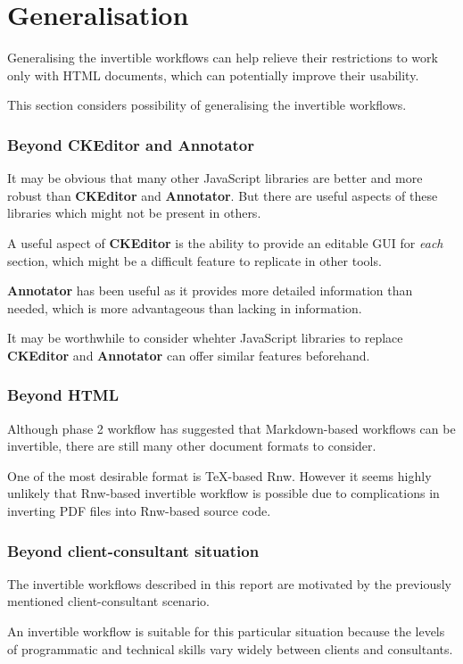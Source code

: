 \documentclass[a4paper, 12pt]{report}
\begin{document}
\section*{Generalisation}
Generalising the invertible workflows can help relieve their restrictions to work only with HTML documents, which can potentially improve their usability.

This section considers possibility of generalising the invertible workflows.


\subsubsection*{Beyond CKEditor and Annotator}
It may be obvious that many other JavaScript libraries are better and more robust than \textbf{CKEditor} and \textbf{Annotator}. But there are useful aspects of these libraries which might not be present in others.

A useful aspect of \textbf{CKEditor} is the ability to provide an editable GUI for \emph{each} section, which might be a difficult feature to replicate in other tools.

\textbf{Annotator} has been useful as it provides more detailed information than needed, which is more advantageous than lacking in information.

It may be worthwhile to consider whehter JavaScript libraries to replace \textbf{CKEditor} and \textbf{Annotator} can offer similar features beforehand.


\subsubsection*{Beyond HTML}
Although phase 2 workflow has suggested that Markdown-based workflows can be invertible, there are still many other document formats to consider.

One of the most desirable format is TeX-based Rnw. However it seems highly unlikely that Rnw-based invertible workflow is possible due to complications in inverting PDF files into Rnw-based source code.


\subsubsection*{Beyond client-consultant situation}
The invertible workflows described in this report are motivated by the previously mentioned client-consultant scenario.

An invertible workflow is suitable for this particular situation because the levels of programmatic and technical skills vary widely between clients and consultants.
\end{document}
